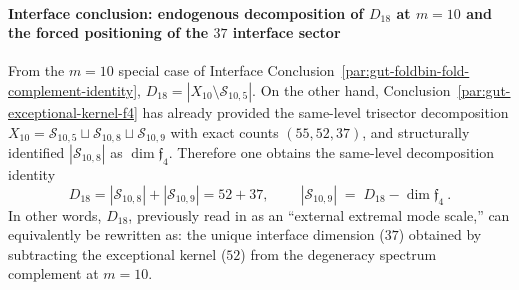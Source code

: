 \paragraph{Interface conclusion: endogenous decomposition of \texorpdfstring{$D_{18}$}{D18} at \texorpdfstring{$m=10$}{m=10} and the forced positioning of the \texorpdfstring{$37$}{37} interface sector}\label{par:gut-d18-endogenous-split}
From the \(m=10\) special case of Interface Conclusion~\ref{par:gut-foldbin-fold-complement-identity},
\(
D_{18}=|X_{10}\setminus\mathcal{S}_{10,5}|
\).
On the other hand, Conclusion~\ref{par:gut-exceptional-kernel-f4} has already provided the same-level trisector decomposition
\(
X_{10}=\mathcal{S}_{10,5}\sqcup\mathcal{S}_{10,8}\sqcup\mathcal{S}_{10,9}
\)
with exact counts \((55,52,37)\), and structurally identified \(|\mathcal{S}_{10,8}|\) as \(\dim\mathfrak{f}_4\).
Therefore one obtains the same-level decomposition identity
\[
D_{18}=|\mathcal{S}_{10,8}|+|\mathcal{S}_{10,9}|=52+37,
\qquad
\boxed{\ |\mathcal{S}_{10,9}|\;=\;D_{18}-\dim\mathfrak{f}_4\ }.
\]
In other words, \(D_{18}\), previously read in as an ``external extremal mode scale,'' can equivalently be rewritten as: the unique interface dimension (\(37\)) obtained by subtracting the exceptional kernel (\(52\)) from the degeneracy spectrum complement at \(m=10\).

